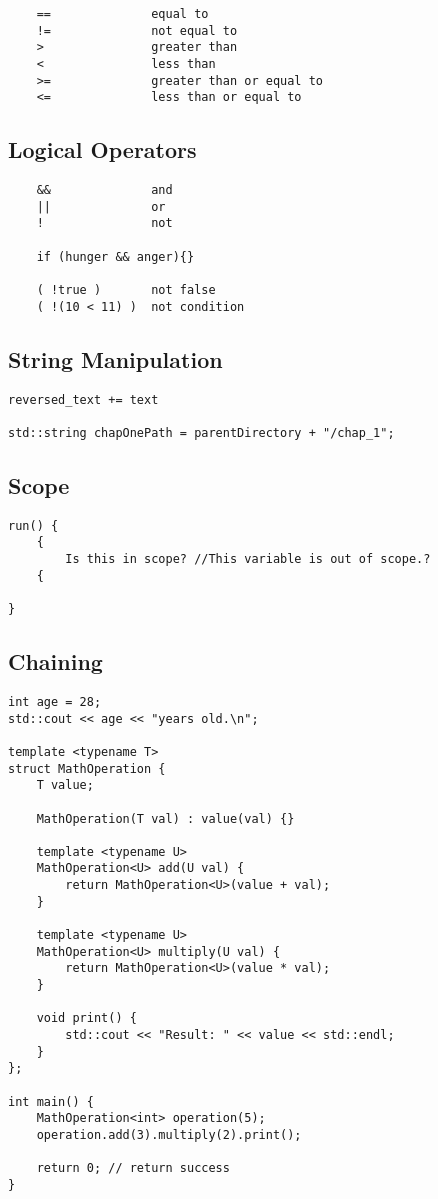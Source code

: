 \begin{verbatim}
    ==              equal to
    !=              not equal to
    >               greater than
    <               less than
    >=              greater than or equal to
    <=              less than or equal to
\end{verbatim}

\subsection{Logical Operators}

\begin{verbatim}
    &&              and 
    ||              or
    !               not

    if (hunger && anger){}

    ( !true )       not false
    ( !(10 < 11) )  not condition 
\end{verbatim}

\subsection{String Manipulation}

\begin{verbatim}
reversed_text += text

std::string chapOnePath = parentDirectory + "/chap_1";
\end{verbatim}

\subsection{Scope}

\begin{verbatim}
run() {
    {
        Is this in scope? //This variable is out of scope.?
    {
    
}
\end{verbatim}

\subsection{Chaining}

\begin{verbatim}
int age = 28;
std::cout << age << "years old.\n";

template <typename T>
struct MathOperation {
    T value;

    MathOperation(T val) : value(val) {}

    template <typename U>
    MathOperation<U> add(U val) {
        return MathOperation<U>(value + val);
    }

    template <typename U>
    MathOperation<U> multiply(U val) {
        return MathOperation<U>(value * val);
    }

    void print() {
        std::cout << "Result: " << value << std::endl;
    }
};

int main() {
    MathOperation<int> operation(5);
    operation.add(3).multiply(2).print();

    return 0; // return success
}
\end{verbatim}

